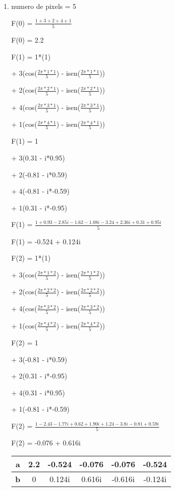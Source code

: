 \begin{question}
  
  \begin{enumerate}[label=\textbf{\alph*})]
    \item 

    numero de pixels = 5

  F(0) = $\frac{1 + 3 + 2 + 4 + 1}{5}$

  F(0) = 2.2

  F(1) = 1*(1) 

  + 3(cos($\frac{2\pi*1*1}{5}$) - isen($\frac{2\pi*1*1}{5}$))
  
  + 2(cos($\frac{2\pi*2*1}{5}$) - isen($\frac{2\pi*2*1}{5}$))

  + 4(cos($\frac{2\pi*3*1}{5}$) - isen($\frac{2\pi*3*1}{5}$))

  + 1(cos($\frac{2\pi*4*1}{5}$) - isen($\frac{2\pi*4*1}{5}$)) 

  F(1) = 1

  + 3(0.31 - i*0.95)
  
  + 2(-0.81 - i*0.59)

  + 4(-0.81 - i*-0.59)

  + 1(0.31 - i*-0.95) 

  F(1) = $\frac{1 + 0.93 - 2.85i -1.62 -1.08i -3.24 + 2.36i + 0.31 +0.95i}{5}$

  F(1) = -0.524 + 0.124i

  F(2) = 1*(1) 

  + 3(cos($\frac{2\pi*1*2}{5}$) - isen($\frac{2\pi*1*2}{5}$))
  
  + 2(cos($\frac{2\pi*2*2}{5}$) - isen($\frac{2\pi*2*2}{5}$))

  + 4(cos($\frac{2\pi*3*2}{5}$) - isen($\frac{2\pi*3*2}{5}$))

  + 1(cos($\frac{2\pi*4*2}{5}$) - isen($\frac{2\pi*4*2}{5}$)) 

  F(2) = 1

  + 3(-0.81 - i*0.59)
  
  + 2(0.31 - i*-0.95) 

  + 4(0.31 - i*0.95)

  + 1(-0.81 - i*-0.59) 

  F(2) = $\frac{1 -2.43 - 1.77i +0.62 +1.90i +1.24 - 3.8i - 0.81 + 0.59i}{5}$

  F(2) = -0.076 + 0.616i

  \begin{table}[ht]
    \centering 
    \begin{tabular}{|c|c|c|c|c|c|}
        \hline
        \textbf{a} & 2.2 & -0.524 & -0.076 & -0.076 & -0.524 \\ 
        \hline
        \textbf{b} & 0 & 0.124i & 0.616i & -0.616i & -0.124i \\ 
        \hline
    \end{tabular}
  \end{table}


\end{enumerate}
\end{question}
